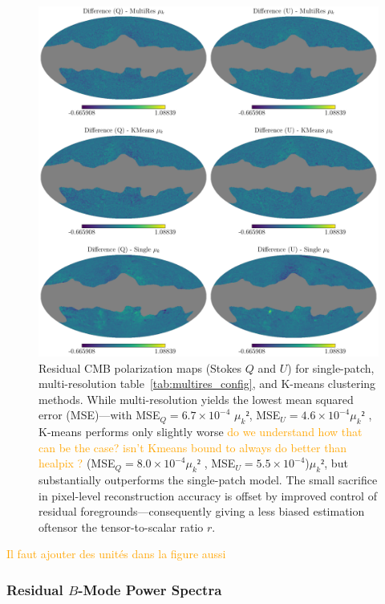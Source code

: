 \documentclass[fleqn,usenatbib]{mnras}
\newcommand{\je}[1]{\textcolor{orange}{#1}}
\begin{document}
\begin{figure}
    \centering
    \includegraphics[width=\linewidth]{figures/cmb_recon.pdf}
    \caption{
    Residual CMB polarization maps (Stokes \( Q \) and \( U \)) for single-patch, multi-resolution table~\ref{tab:multires_config}, and K-means clustering methods.  
    While multi-resolution yields the lowest mean squared error (MSE)—with MSE\(_Q = 6.7 \times 10^{-4}\) $\mu_k²$, MSE\(_U = 4.6 \times 10^{-4}\)$\mu_k²$ , K-means performs only slightly worse \je{do we understand how that can be the case? isn't Kmeans bound to always do better than healpix ?} (MSE\(_Q = 8.0 \times 10^{-4}\)$\mu_k²$ , MSE\(_U = 5.5 \times 10^{-4}\))$\mu_k²$,  but substantially outperforms the single-patch model. 
    The small sacrifice in pixel-level reconstruction accuracy is offset by improved control of residual foregrounds—consequently giving a less biased estimation oftensor the tensor-to-scalar ratio \( r \).
    }
    \label{fig:cmb_qu_comparison}
\end{figure}

\je{Il faut ajouter des unités dans la figure aussi}

\subsubsection*{Residual \( B \)-Mode Power Spectra}
\label{subsec:residual_bb_spectra}
\end{document}
